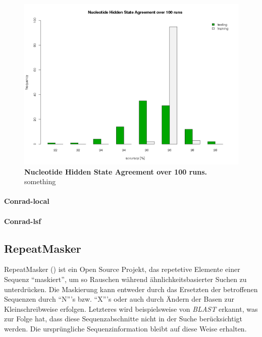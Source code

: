 \begin{figure}[ht]
	\begin{center}
		\includegraphics[scale=0.42]{pics/agree2.png}
	\caption[Nucleotide Hidden State Agreement over 100 runs]{
	\textbf{Nucleotide Hidden State Agreement over 100 runs.}
	something}
	\end{center}
	\label{fig:agree2}
\end{figure}

\paragraph{Conrad-local}
\paragraph{Conrad-lsf}
\subsection{RepeatMasker}
RepeatMasker
()
ist ein Open Source Projekt, das repetetive Elemente einer Sequenz
\enquote{maskiert}, um so Rauschen während ähnlichkeitsbasierter Suchen zu
unterdrücken.
Die Maskierung kann entweder durch das Ersetzten der betroffenen Sequenzen
durch \enquote{N}'s bzw. \enquote{X}'s oder auch durch Ändern der Basen zur
Kleinschreibweise erfolgen.
Letzteres wird beispielsweise von \textit{BLAST} erkannt, was zur Folge hat,
dass diese Sequenzabschnitte nicht in der Suche berücksichtigt werden.
Die ursprüngliche Sequenzinformation bleibt auf diese Weise	erhalten.

